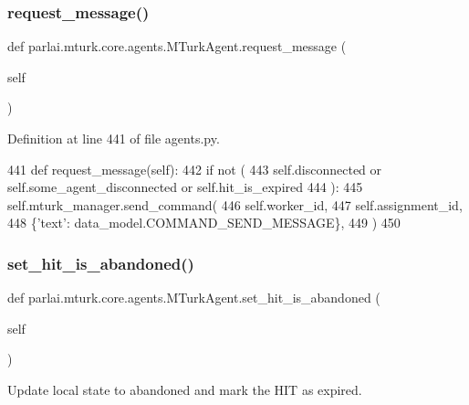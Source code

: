 \subsubsection{\texorpdfstring{request\+\_\+message()}{request\_message()}}
{\footnotesize\ttfamily def parlai.\+mturk.\+core.\+agents.\+M\+Turk\+Agent.\+request\+\_\+message (\begin{DoxyParamCaption}\item[{}]{self }\end{DoxyParamCaption})}



Definition at line 441 of file agents.\+py.


\begin{DoxyCode}
441     \textcolor{keyword}{def }request\_message(self):
442         \textcolor{keywordflow}{if} \textcolor{keywordflow}{not} (
443             self.disconnected \textcolor{keywordflow}{or} self.some\_agent\_disconnected \textcolor{keywordflow}{or} self.hit\_is\_expired
444         ):
445             self.mturk\_manager.send\_command(
446                 self.worker\_id,
447                 self.assignment\_id,
448                 \{\textcolor{stringliteral}{'text'}: data\_model.COMMAND\_SEND\_MESSAGE\},
449             )
450 
\end{DoxyCode}
\mbox{\label{classparlai_1_1mturk_1_1core_1_1agents_1_1MTurkAgent_a71115b83b70d4730c54e61837846d914}} 
\subsubsection{\texorpdfstring{set\+\_\+hit\+\_\+is\+\_\+abandoned()}{set\_hit\_is\_abandoned()}}
{\footnotesize\ttfamily def parlai.\+mturk.\+core.\+agents.\+M\+Turk\+Agent.\+set\+\_\+hit\+\_\+is\+\_\+abandoned (\begin{DoxyParamCaption}\item[{}]{self }\end{DoxyParamCaption})}

\begin{DoxyVerb}Update local state to abandoned and mark the HIT as expired.
\end{DoxyVerb}
 

